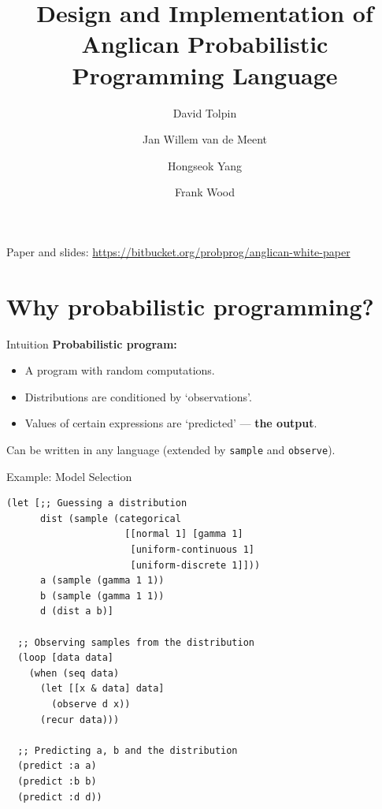 \documentclass{beamer}
\title{Design and Implementation of\\Anglican Probabilistic Programming Language}
\author{David Tolpin \and Jan Willem van de Meent \and Hongseok Yang \and Frank Wood}
\begin{document}
\begin{frame}
\titlepage
\vfill
\center
Paper and slides: \url{https://bitbucket.org/probprog/anglican-white-paper}

\end{frame}

\section{Why probabilistic programming?}

\begin{frame}{Intuition}
    \textbf{Probabilistic program:}
\begin{itemize}
\item A program with random computations.
\item Distributions are conditioned by `observations'.
\item Values of certain expressions are `predicted' --- \textbf{the output}.
\end{itemize}

Can be written in any language (extended by \texttt{sample} and \texttt{observe}).
\end{frame}

\begin{frame}[fragile]{Example: Model Selection}
\begin{verbatim}
(let [;; Guessing a distribution
      dist (sample (categorical
                     [[normal 1] [gamma 1]
                      [uniform-continuous 1]
                      [uniform-discrete 1]]))
      a (sample (gamma 1 1))
      b (sample (gamma 1 1))
      d (dist a b)]

  ;; Observing samples from the distribution
  (loop [data data]
    (when (seq data)
      (let [[x & data] data]
        (observe d x))
      (recur data)))

  ;; Predicting a, b and the distribution
  (predict :a a) 
  (predict :b b)
  (predict :d d))
\end{verbatim}
\end{frame}
\end{document}
